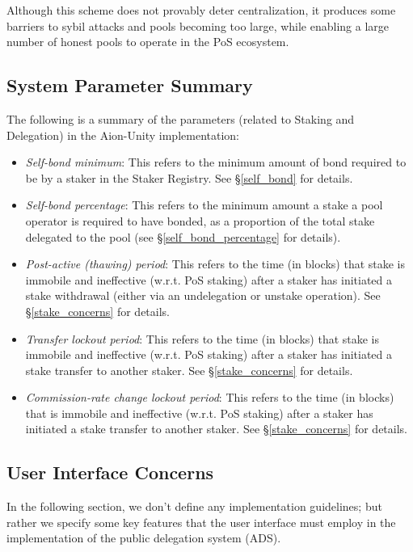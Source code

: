 Although this scheme does not provably deter centralization, it produces some barriers to sybil attacks and pools becoming too large, while enabling a large number of honest pools to operate in the PoS ecosystem.

\subsection{System Parameter Summary} \label{unspecified_parameters}
The following is a summary of the parameters (related to Staking and Delegation) in the Aion-Unity implementation: 
\begin{itemize}
    \item \textit{Self-bond minimum}: This refers to the minimum amount of bond required to be  by a staker in the Staker Registry. See \S\ref{self_bond} for details.
    \item \textit{Self-bond percentage}: This refers to the minimum amount a stake a pool operator is required to have bonded, as a proportion of the total stake delegated to the pool (see \S\ref{self_bond_percentage} for details).
    \item \textit{Post-active (thawing) period}: This refers to the time (in blocks) that stake is immobile and ineffective (w.r.t. PoS staking) after a staker has initiated a stake withdrawal (either via an undelegation or unstake operation). See \S\ref{stake_concerns} for details. 
    \item \textit{Transfer lockout period}: This refers to the time (in blocks) that stake is immobile and ineffective (w.r.t. PoS staking) after a staker has initiated a stake transfer to another staker. See \S\ref{stake_concerns} for details. 
    \item \textit{Commission-rate change lockout period}: This refers to the time (in blocks) that  is immobile and ineffective (w.r.t. PoS staking) after a staker has initiated a stake transfer to another staker. See \S\ref{stake_concerns} for details. 
    
\end{itemize}

\clearpage
\subsection{User Interface Concerns} \label{ads_ui}
In the following section, we don't define any implementation guidelines; but rather we specify some key features that the user interface must employ in the implementation of the public delegation system (ADS). 

